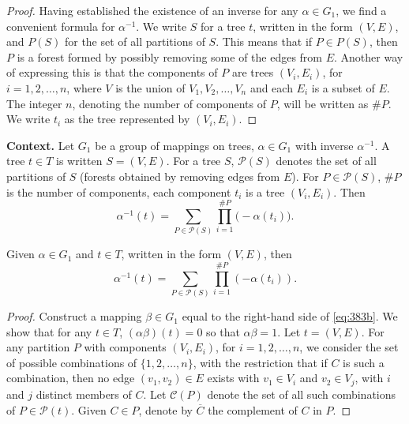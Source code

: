 \begin{theorem}
\begin{proof}
Having established the existence of an inverse for any $\alpha \in G_1$, we find a
convenient formula for $\alpha^{-1}$. We write $S$ for a tree $t$, written in the form $(V, E)$,
and $P(S)$ for the set of all partitions of $S$. This means that if $P \in P(S)$, then
$P$ is a forest formed by possibly removing some of the edges from $E$. Another
way of expressing this is that the components of $P$ are trees $(V_i, E_i)$, for
$i = 1, 2, \dots, n$, where $V$ is the union of $V_1, V_2, \dots, V_n$ and each $E_i$ is a subset
of $E$. The integer $n$, denoting the number of components of $P$, will be written
as $\#P$. We write $t_i$ as the tree represented by $(V_i, E_i)$.
\end{proof}

\noindent\textbf{Context.}
Let $G_1$ be a group of mappings on trees, $\alpha\in G_1$ with inverse $\alpha^{-1}$. A tree $t\in T$ is written $S=(V,E)$. For a tree $S$, $\mathcal{P}(S)$ denotes the set of all partitions of $S$ (forests obtained by removing edges from $E$). For $P\in\mathcal{P}(S)$, $\#P$ is the number of components, each component $t_i$ is a tree $(V_i,E_i)$. Then
\begin{equation}
\alpha^{-1}(t)=\sum_{P\in\mathcal{P}(S)}\prod_{i=1}^{\#P}\bigl(-\alpha(t_i)\bigr). \tag{383b}
\end{equation}

\begin{lemma}
  \label{lem:383D}
\label{lem:383D}
Given $\alpha \in G_1$ and $t \in T$, written in the form $(V, E)$, then
\[
\alpha^{-1}(t) = \sum_{P \in \mathcal{P}(S)} \prod_{i=1}^{\#P} (-\alpha(t_i)).
\tag{383b}
\]
\end{lemma}

\begin{proof}
Construct a mapping $\beta \in G_1$ equal to the right-hand side of \eqref{eq:383b}.
We show that for any $t \in T$, $(\alpha\beta)(t) = 0$ so that $\alpha\beta = 1$. Let $t = (V, E)$.
For any partition $P$ with components $(V_i, E_i)$, for $i = 1, 2, \dots, n$, we consider
the set of possible combinations of $\{1, 2, \dots, n\}$, with the restriction that if
$C$ is such a combination, then no edge $(v_1, v_2) \in E$ exists with $v_1 \in V_i$ and
$v_2 \in V_j$, with $i$ and $j$ distinct members of $C$. Let $\mathcal{C}(P)$ denote the set of all
such combinations of $P \in \mathcal{P}(t)$. Given $C \in P$, denote by $\overline{C}$ the complement
of $C$ in $P$.


\end{proof}
\end{theorem}
